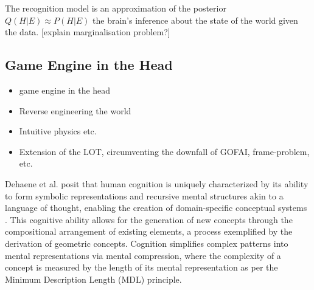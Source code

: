 The recognition model is an approximation of the posterior \(Q(H \vert E) \approx P(H \vert E) \) the brain's inference about the state of the world given the data.
[explain marginalisation problem?]






















\subsection{Game Engine in the Head}

\begin{itemize}
    \item game engine in the head
    \item Reverse engineering the world
    \item Intuitive physics etc. 
    \item Extension of the LOT, circumventing the downfall of GOFAI, frame-problem, etc. 
\end{itemize}


Dehaene et al. posit that human cognition is uniquely characterized by its ability to form symbolic representations and recursive mental structures akin to a language of thought, enabling the creation of domain-specific conceptual systems \cite{dehaene_symbols_2022}. This cognitive ability allows for the generation of new concepts through the compositional arrangement of existing elements, a process exemplified by the derivation of geometric concepts. Cognition simplifies complex patterns into mental representations via mental compression, where the complexity of a concept is measured by the length of its mental representation as per the Minimum Description Length (MDL) principle.

